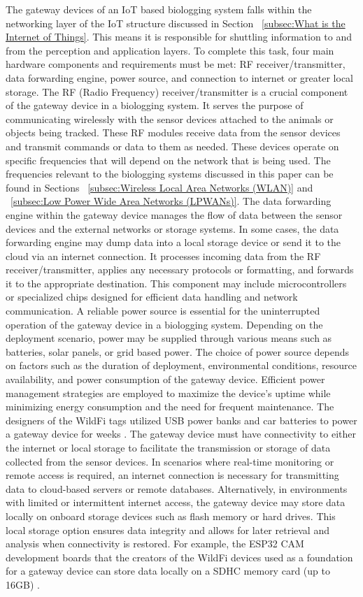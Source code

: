 \documentclass[sigplan,screen,nonacm]{acmart}
\begin{document}
The gateway devices of an IoT based biologging system falls within the networking layer of the IoT 
structure discussed in Section ~\ref{subsec:What is the Internet of Things}. This means it is responsible 
for shuttling information to and from the perception and application layers. To complete this task, four main 
hardware components and requirements must be met: RF receiver/transmitter, data forwarding engine, power source, 
and connection to internet or greater local storage.
The RF (Radio Frequency) receiver/transmitter is a crucial component of the gateway device in a biologging system. 
It serves the purpose of communicating wirelessly with the sensor devices attached to the animals or objects being 
tracked. These RF modules receive data from the sensor devices and transmit commands or data to them as needed. 
These devices operate on specific frequencies that will depend on the network that is being used. The frequencies 
relevant to the biologging systems discussed in this paper can be found in Sections ~\ref{subsec:Wireless Local Area Networks (WLAN)} and ~\ref{subsec:Low Power Wide Area Networks (LPWANs)}.
The data forwarding engine within the gateway device manages the flow of data between the sensor devices and 
the external networks or storage systems. In some cases, the data forwarding engine may dump data into a local storage 
device or send it to the cloud via an internet connection. It processes incoming data from the RF receiver/transmitter, 
applies any necessary protocols or formatting, and forwards it to the appropriate destination. This component may include 
microcontrollers or specialized chips designed for efficient data handling and network communication.
A reliable power source is essential for the uninterrupted operation of the gateway device in a biologging system. 
Depending on the deployment scenario, power may be supplied through various means such as batteries, solar panels, 
or grid based power. The choice of power source depends on factors such as the duration of deployment, 
environmental conditions, resource availability, and power consumption of the gateway device. Efficient power management 
strategies are employed to maximize the device's uptime while minimizing energy consumption and the need for frequent 
maintenance. The designers of the WildFi tags utilized USB power banks and car batteries to power a gateway device for 
weeks \cite{wild2023internet}. 
The gateway device must have connectivity to either the internet or local storage to facilitate the transmission or 
storage of data collected from the sensor devices. In scenarios where real-time monitoring or remote access is required, 
an internet connection is necessary for transmitting data to cloud-based servers or remote databases. Alternatively, in 
environments with limited or intermittent internet access, the gateway device may store data locally on onboard storage 
devices such as flash memory or hard drives. This local storage option ensures data integrity and allows for later 
retrieval and analysis when connectivity is restored. For example, the ESP32 CAM development boards that the creators 
of the WildFi devices used as a foundation for a gateway device can store data locally on a SDHC memory card (up to 16GB) 
\cite{wild2023internet}.
\end{document}
